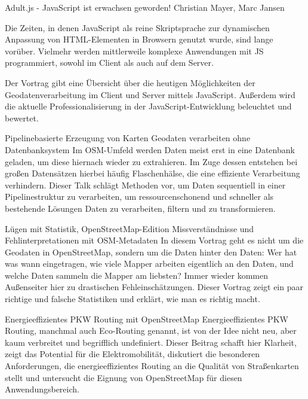 \abstractZwei{ }%
{Adult.js - JavaScript ist erwachsen geworden!}%
{Christian Mayer, Marc Jansen}%
{%
Die Zeiten, in denen JavaScript als reine Skriptsprache zur dynamischen Anpassung von HTML-Elementen in Browsern genutzt wurde, sind lange vorüber. Vielmehr werden mittlerweile komplexe Anwendungen mit JS programmiert, sowohl im Client als auch auf dem Server.

Der Vortrag gibt eine Übersicht über die heutigen Möglichkeiten der Geodatenverarbeitung im Client und Server mittels JavaScript. Außerdem wird die aktuelle Professionalisierung in der JavaScript-Entwicklung beleuchtet und bewertet.%
}

%
{Pipelinebasierte Erzeugung von Karten}%
{Geodaten verarbeiten ohne Datenbanksystem}%
{%
Im OSM-Umfeld werden Daten meist erst in eine Datenbank geladen, um diese hiernach wieder zu extrahieren. Im Zuge dessen entstehen bei großen Datensätzen hierbei häufig Flaschenhälse, die eine effiziente Verarbeitung verhindern. Dieser Talk schlägt Methoden vor, um Daten sequentiell in einer Pipelinestruktur zu verarbeiten, um ressourcenschonend und schneller als bestehende Lösungen Daten zu verarbeiten, filtern und zu transformieren.%
}


%
{Lügen mit Statistik, OpenStreetMap-Edition}%
{Missverständnisse und Fehlinterpretationen mit OSM-Metadaten}%
{%
In diesem Vortrag geht es nicht um die Geodaten in OpenStreetMap, sondern um die Daten hinter den Daten: Wer hat was wann eingetragen, wie viele Mapper arbeiten eigentlich an den Daten, und welche Daten sammeln die Mapper am liebsten? Immer wieder kommen Außenseiter hier zu drastischen Fehleinschätzungen. Dieser Vortrag zeigt ein paar richtige und falsche Statistiken und erklärt, wie man es richtig macht.%
}

%
{Energieeffizientes PKW Routing mit OpenStreetMap}%
{}%
{%
Energieeffizientes PKW Routing, manchmal auch Eco-Routing genannt, ist von der Idee nicht neu, aber kaum verbreitet und begrifflich undefiniert. Dieser Beitrag schafft hier Klarheit, zeigt das Potential für die Elektromobilität, diskutiert die besonderen Anforderungen, die energieeffizientes Routing an die Qualität von Straßenkarten stellt und untersucht die Eignung von OpenStreetMap für diesen Anwendungsbereich.%
}

